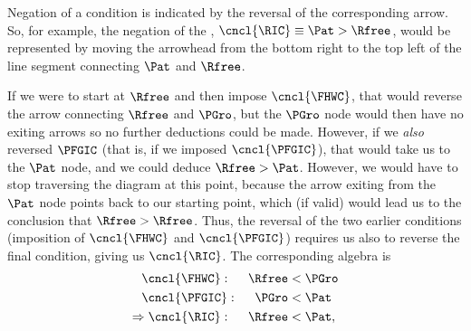 \documentclass[\econtexRoot/BufferStockTheory]{subfiles}
\begin{document}
Negation of a condition is indicated by the reversal of the corresponding arrow.  So, for example, the negation of the {\RIC},  $\cncl{\RIC} \equiv \Pat > \Rfree$, would be represented by moving the arrowhead from the bottom right to the top left of the line segment connecting {$\Pat$} and $\Rfree$.

\providecommand{\figName}{RelatePFGICFHWCRICPFFVAC} %
\providecommand{\figFile}{\figName} %
\hypertarget{\figFile-App}{}

If we were to start at $\Rfree$ and then impose $\cncl{\FHWC}$, that would reverse the arrow connecting $\Rfree$ and $\PGro$, but the $\PGro$ node would then have no exiting arrows so no further deductions could be made.  However, if we \textit{also} reversed $\PFGIC$ (that is, if we imposed $\cncl{\PFGIC}$), that would take us to the $\Pat$ node, and we could deduce $\Rfree > \Pat$.  However, we would have to stop traversing the diagram at this point, because the arrow exiting from the $\Pat$ node points back to our starting point, which (if valid) would lead us to the conclusion that $\Rfree > \Rfree$.  Thus, the reversal of the two earlier conditions (imposition of $\cncl{\FHWC}$ and $\cncl{\PFGIC}$) requires us also to reverse the final condition, giving us $\cncl{\RIC}$.  The corresponding algebra is
\begin{equation}\begin{gathered}\begin{aligned}
  \cncl{\FHWC}:~~~~  \Rfree & < \PGro \notag  
  \\ \cncl{\PFGIC}:~~~~ \PGro & < \Pat %
                                \label{eq:cnclRIC}
  \\ \Rightarrow \cncl{\RIC}:~~~~\Rfree & < \Pat \notag,
\end{aligned}\end{gathered}\end{equation}

\end{document}
